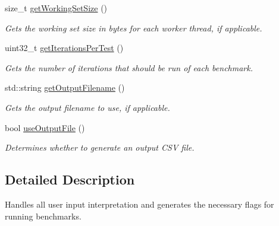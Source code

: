 \begin{DoxyCompactItemize}
size\-\_\-t \hyperlink{classxmem_1_1config_1_1_configurator_ad237760f0e0f76add3693bded410d749}{get\-Working\-Set\-Size} ()
\begin{DoxyCompactList}\small\item\em Gets the working set size in bytes for each worker thread, if applicable. \end{DoxyCompactList}\item 
uint32\-\_\-t \hyperlink{classxmem_1_1config_1_1_configurator_a0cae90ae39a85c42b884f59c983ddb98}{get\-Iterations\-Per\-Test} ()
\begin{DoxyCompactList}\small\item\em Gets the number of iterations that should be run of each benchmark. \end{DoxyCompactList}\item 
std\-::string \hyperlink{classxmem_1_1config_1_1_configurator_ad05eaa100414599543085778ca75ff64}{get\-Output\-Filename} ()
\begin{DoxyCompactList}\small\item\em Gets the output filename to use, if applicable. \end{DoxyCompactList}\item 
bool \hyperlink{classxmem_1_1config_1_1_configurator_a10a655ca8cea9e4d1f65e3f907a858a1}{use\-Output\-File} ()
\begin{DoxyCompactList}\small\item\em Determines whether to generate an output C\-S\-V file. \end{DoxyCompactList}\end{DoxyCompactItemize}


\subsection{Detailed Description}
Handles all user input interpretation and generates the necessary flags for running benchmarks. 

